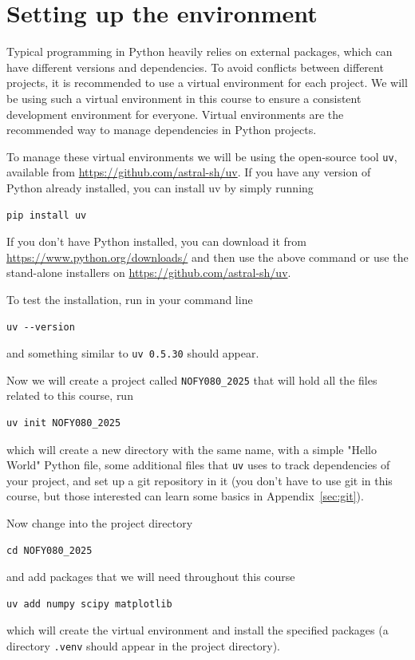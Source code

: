 \newpage
\section{Setting up the environment}
Typical programming in Python heavily relies on external packages, which can have different versions and dependencies. To avoid conflicts between different projects, it is recommended to use a virtual environment for each project. We will be using such a virtual environment in this course to ensure a consistent development environment for everyone. Virtual environments are the recommended way to manage dependencies in Python projects.

To manage these virtual environments we will be using the open-source tool \verb|uv|, available from \url{https://github.com/astral-sh/uv}. If you have any version of Python already installed, you can install uv by simply running
\begin{lstlisting}
pip install uv
\end{lstlisting}
If you don't have Python installed, you can download it from \url{https://www.python.org/downloads/} and then use the above command or use the stand-alone installers on \url{https://github.com/astral-sh/uv}.

To test the installation, run in your command line
\begin{lstlisting}
uv --version
\end{lstlisting}
and something similar to \verb|uv 0.5.30| should appear.

Now we will create a project called \verb|NOFY080_2025| that will hold all the files related to this course, run
\begin{lstlisting}
uv init NOFY080_2025
\end{lstlisting}
which will create a new directory with the same name, with a simple "Hello World" Python file, some additional files that \verb|uv| uses to track dependencies of your project, and set up a git repository in it (you don't have to use git in this course, but those interested can learn some basics in Appendix~\ref{sec:git}).

Now change into the project directory
\begin{lstlisting}
cd NOFY080_2025
\end{lstlisting}
and add packages that we will need throughout this course
\begin{lstlisting}
uv add numpy scipy matplotlib
\end{lstlisting}
which will create the virtual environment and install the specified packages (a directory \verb|.venv| should appear in the project directory).

